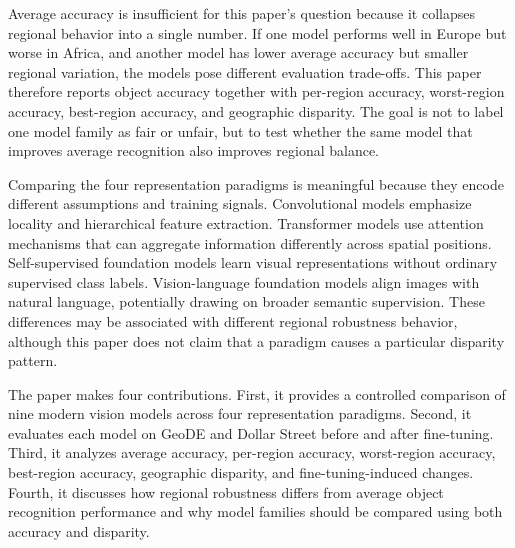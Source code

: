 Average accuracy is insufficient for this paper's question because it collapses regional behavior into a single number. If one model performs well in Europe but worse in Africa, and another model has lower average accuracy but smaller regional variation, the models pose different evaluation trade-offs. This paper therefore reports object accuracy together with per-region accuracy, worst-region accuracy, best-region accuracy, and geographic disparity. The goal is not to label one model family as fair or unfair, but to test whether the same model that improves average recognition also improves regional balance.

Comparing the four representation paradigms is meaningful because they encode different assumptions and training signals. Convolutional models emphasize locality and hierarchical feature extraction. Transformer models use attention mechanisms that can aggregate information differently across spatial positions. Self-supervised foundation models learn visual representations without ordinary supervised class labels. Vision-language foundation models align images with natural language, potentially drawing on broader semantic supervision. These differences may be associated with different regional robustness behavior, although this paper does not claim that a paradigm causes a particular disparity pattern.

The paper makes four contributions. First, it provides a controlled comparison of nine modern vision models across four representation paradigms. Second, it evaluates each model on GeoDE and Dollar Street before and after fine-tuning. Third, it analyzes average accuracy, per-region accuracy, worst-region accuracy, best-region accuracy, geographic disparity, and fine-tuning-induced changes. Fourth, it discusses how regional robustness differs from average object recognition performance and why model families should be compared using both accuracy and disparity.
